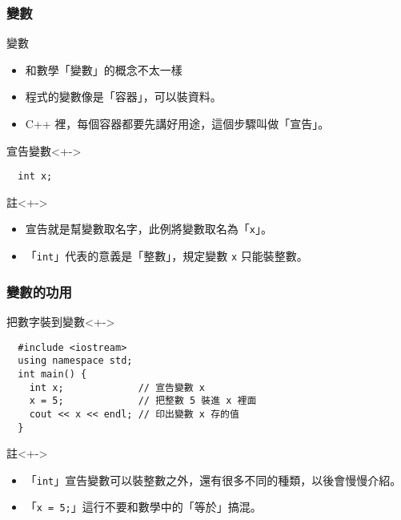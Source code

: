 \documentclass[utf8]{beamer}
\begin{document}
\begin{CJK}{UTF8}{bkai}
\begin{frame}[fragile]
  \frametitle{變數}
  \begin{block}{變數}
    \begin{itemize}[<+->]
    \item 和數學「變數」的概念不太一樣
    \item 程式的變數像是「\alert{容器}」，可以裝資料。
    \item C++ 裡，每個容器都要先講好\alert{用途}，這個步驟叫做「\alert{宣告}」。
    \end{itemize}
  \end{block}
  \begin{alertblock}{宣告變數}<+->
  \begin{lstlisting}
  int x;
  \end{lstlisting}
  \end{alertblock}
  \begin{exampleblock}{註}<+->
    \begin{itemize}
    \item 宣告就是幫變數取名字，此例將變數取名為「\lstinline{x}{}」。
    \item<+-> 「\lstinline{int}{}」代表的意義是「\alert{整數}」，規定變數 \lstinline{x}{} \alert{只能裝整數}。
    \end{itemize}
  \end{exampleblock}
\end{frame}

\begin{frame}[fragile]
  \frametitle{變數的功用}
  \begin{block}{把數字裝到變數}<+->
  \begin{lstlisting}
  #include <iostream>
  using namespace std;
  int main() {
    int x;             // 宣告變數 x
    x = 5;             // 把整數 5 裝進 x 裡面
    cout << x << endl; // 印出變數 x 存的值
  }
  \end{lstlisting}
  \end{block}
  \begin{exampleblock}{註}<+->
    \begin{itemize}
    \item 「\lstinline{int}{}」宣告變數可以裝整數之外，還有很多不同的種類，以後會慢慢介紹。
    \item<+-> 「\lstinline{x = 5;}{}」這行\alert{不要}和數學中的「等於」搞混。
    \end{itemize}
  \end{exampleblock}
\end{frame}


\end{CJK}
\end{document}
